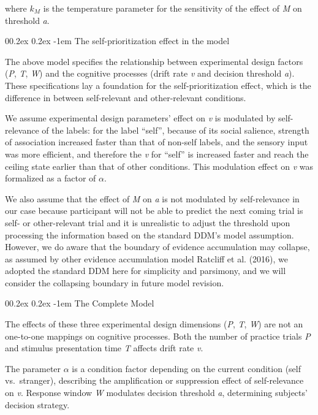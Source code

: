 \documentclass[
  english,
  man,floatsintext]{apa6}
\makeatletter
\let\oldparagraph\paragraph
\renewcommand{\paragraph}{
    \@ifstar
      \xxxParagraphStar
      \xxxParagraphNoStar
  }
\newcommand{\xxxParagraphStar}[1]{\oldparagraph*{#1}\mbox{}}
\newcommand{\xxxParagraphNoStar}[1]{\oldparagraph{#1}\mbox{}}
\renewcommand{\paragraph}{\@startsection{paragraph}{4}{\parindent}%
  {0\baselineskip \@plus 0.2ex \@minus 0.2ex}%
  {-1em}%
  {\normalfont\normalsize\bfseries\itshape\typesectitle}}
\makeatother
\begin{document}
where \(k_M\) is the temperature parameter for the sensitivity of the effect of \emph{M} on threshold \emph{a}.

\paragraph{The self-prioritization effect in the model}\label{the-self-prioritization-effect-in-the-model}

The above model specifies the relationship between experimental design factors (\emph{P}, \emph{T}, \emph{W}) and the cognitive processes (drift rate \emph{v} and decision threshold \emph{a}). These specifications lay a foundation for the self-prioritization effect, which is the difference in between self-relevant and other-relevant conditions.

We assume experimental design parameters' effect on \emph{v} is modulated by self-relevance of the labels: for the label ``self'', because of its social salience, strength of association increased faster than that of non-self labels, and the sensory input was more efficient, and therefore the \emph{v} for ``self'' is increased faster and reach the ceiling state earlier than that of other conditions. This modulation effect on \emph{v} was formalized as a factor of \(\alpha\).

We also assume that the effect of \emph{M} on \emph{a} is not modulated by self-relevance in our case because participant will not be able to predict the next coming trial is self- or other-relevant trial and it is unrealistic to adjust the threshold upon processing the information based on the standard DDM's model assumption. However, we do aware that the boundary of evidence accumulation may collapse, as assumed by other evidence accumulation model Ratcliff et al. (2016), we adopted the standard DDM here for simplicity and parsimony, and we will consider the collapsing boundary in future model revision.

\paragraph{The Complete Model}\label{the-complete-model}

The effects of these three experimental design dimensions (\emph{P}, \emph{T}, \emph{W}) are not an one-to-one mappings on cognitive processes. Both the number of practice trials \emph{P} and stimulus presentation time \emph{T} affects drift rate \emph{v}.

The parameter \(\alpha\) is a condition factor depending on the current condition (self vs.~stranger), describing the amplification or suppression effect of self-relevance on \emph{v}. Response window \emph{W} modulates decision threshold \emph{a}, determining subjects' decision strategy.
\end{document}
